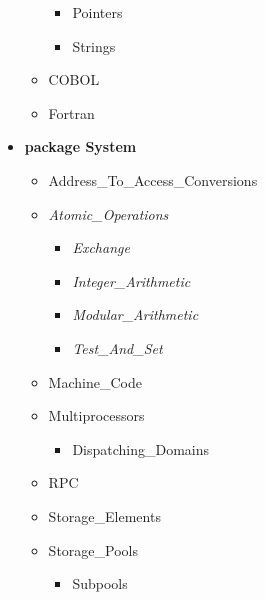 \documentclass[english]{article}
\begin{document}
\begin{scriptsize}
\begin{multicols*}{5}
\begin{itemize}[leftmargin=0mm]
\begin{itemize}[leftmargin=5mm]
\begin{itemize}[leftmargin=5mm]
         \item[] Pointers
         \item[] Strings
      \end{itemize}
   \item[] COBOL
   \item[] Fortran
   \end{itemize}
\item[] \textbf{package System}
   \begin{itemize}[leftmargin=5mm]
      \item[] Address\_To\_Access\_Conversions
      \item[] \textit{Atomic\_Operations}
         \begin{itemize}[leftmargin=5mm]
            \item[] \textit{Exchange}
            \item[] \textit{Integer\_Arithmetic}
            \item[] \textit{Modular\_Arithmetic}
            \item[] \textit{Test\_And\_Set}
         \end{itemize}
      \item[] Machine\_Code
      \item[] Multiprocessors
         \begin{itemize}[leftmargin=5mm]
            \item[] Dispatching\_Domains
         \end{itemize}
      \item[] RPC
      \item[] Storage\_Elements
      \item[] Storage\_Pools
         \begin{itemize}[leftmargin=5mm]
            \item[] Subpools
         \end{itemize}
   \end{itemize}
\end{itemize}
\end{multicols*}
\end{scriptsize}
\end{document}
